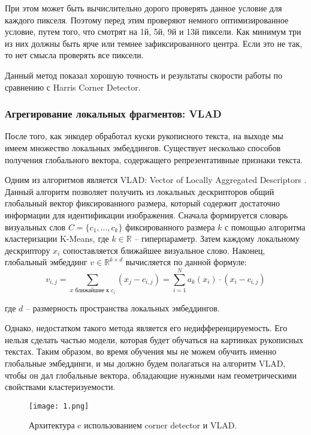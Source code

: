     При этом может быть вычислительно дорого проверять данное условие для каждого пикселя. Поэтому перед этим проверяют немного оптимизированное условие, путем того, что смотрят на 1й, 5й, 9й и 13й пиксели. Как минимум три из них должны быть ярче или темнее зафиксированного центра. Если это не так, то нет смысла проверять все пиксели.

    Данный метод показал хорошую точность и результаты скорости работы по сравнению с Harris Corner Detector.

\subsubsection{Агрегирование локальных фрагментов: VLAD}

    После того, как энкодер обработал куски рукописного текста, на выходе мы имеем множество локальных эмбеддингов. Существует несколько способов получения глобального вектора, содержащего репрезентативные признаки текста. 

    Одним из алгоритмов является VLAD: Vector of Locally Aggregated Descriptors \cite{vlad_original}. Данный алгоритм позволяет получить из локальных дескрипторов общий глобальный вектор фиксированного размера, который содержит достаточно информации для идентификации изображения. Сначала формируется словарь визуальных слов $C = \{ c_1, \dots, c_k \}$ фиксированного размера $k$ с помощью алгоритма кластеризации K-Means, где $k \in \mathbb{R}$ -- гиперпараметр. Затем каждому локальному дескриптору $x_i$ сопоставляется ближайшее визуальное слово. Наконец, глобальный эмбеддинг $v \in \mathbb{R}^{k \times d}$ вычисляется по данной формуле:
    $$
        v_{i, j} = \sum_{x \text{ ближайшие к } c_i} (x_j - c_{i, j}) = \sum_{i = 1}^N a_k(x_i) \cdot (x_i - c_{i, j})
    $$

    \noindent
    где $d$ -- размерность пространства локальных эмбеддингов.

    Однако, недостатком такого метода является его недифференцируемость. Его нельзя сделать частью модели, которая будет обучаться на картинках рукописных текстах. Таким образом, во время обучения мы не можем обучить именно глобальные эмбеддинги, и мы должно будем полагаться на алгоритм VLAD, чтобы он дал глобальные вектора, обладающие нужными нам геометрическими свойствами кластеризуемости.
    
    \begin{figure}[htbp]
        \centering
        \texttt{[image: 1.png]}
        \caption{Архитектура c использованием corner detector и VLAD.}
        \label{fig:corner}
    \end{figure}

